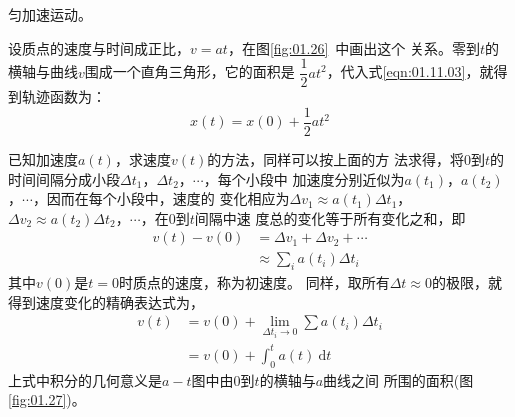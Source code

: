   \vspace{-1em}\example 匀加速运动。

  设质点的速度与时间成正比，$v=at$，在图\ref{fig:01.26}~中画出这个
关系。零到$t$的横轴与曲线$v$围成一个直角三角形，它的面积是
$\dfrac{1}{2} a t^2$，代入式\eqref{eqn:01.11.03}，就得到轨迹函数为：
\begin{equation*}\label{eqn:01.11.04i}
    x(t)=x(0)+\frac{1}{2}at^2 \tag{1.11.4$'$}
\end{equation*}

    已知加速度$a(t)$，求速度$v(t)$的方法，同样可以按上面的方
法求得，将0到$t$的时间间隔分成小段$\Delta t_1$，$\Delta t_2$，$\cdots$，每个小段中
加速度分别近似为$a(t_1)$，$a(t_2)$，$\cdots$，因而在每个小段中，速度的
变化相应为$\Delta v_1\approx a(t_1)\Delta t_1$，$\Delta v_2\approx a(t_2)\Delta t_2$，$\cdots$，在0到$t$间隔中速
度总的变化等于所有变化之和，即
\begin{equation}\label{eqn:01.11.05}
    \begin{aligned}
        v(t)-v(0) &=\Delta v_{1}+\Delta v_{2}+\cdots \\
        & \approx \sum_{i} a\left(t_{i}\right) \Delta t_{i}
    \end{aligned}
\end{equation}
其中$v(0)$是$t=0$时质点的速度，称为初速度。
同样，取所有$\Delta t\approx 0$的极限，就得到速度变化的精确表达式为，
\begin{equation}\label{eqn:01.11.06}
    \begin{aligned}
        v(t) &=v(0)+\lim _{\Delta t_{i} \rightarrow 0} \sum a(t_{i}) \Delta t_{i} \\
        &=v(0)+\int_{0}^{t} a(t) {~\mathrm d}  t
    \end{aligned}
\end{equation}
上式中积分的几何意义是$a-t$图中由0到$t$的横轴与$a$曲线之间
所围的面积(图\ref{fig:01.27})。

